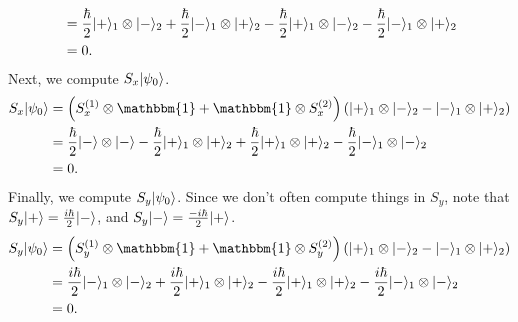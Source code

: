 \documentclass[11pt, letterpaper]{article}
\begin{document}
\begin{enumerate}
\begin{align*}
			&=\frac{\hbar }{2} \lvert+\rangle_1 \otimes \lvert-\rangle_2+\frac{\hbar }{2} \lvert-\rangle_1 \otimes \lvert+\rangle _2-\frac{\hbar }{2} \lvert+\rangle_1 \otimes \lvert-\rangle _2-\frac{\hbar }{2} \lvert-\rangle _1\otimes \lvert+\rangle _2\\
			&=0
		.\end{align*}
		Next, we compute $S_x\lvert\psi _0\rangle $.
		\begin{align*}
			S_x\ket{\psi _0} &=\left( S_x^{(1)} \otimes \mathbbm{1}+\mathbbm{1}\otimes S_x^{(2)}   \right) \left( \ket{+}_1 \otimes \ket{-} _2-\ket{-} _1\otimes \ket{+} _2 \right)\\
			&=\frac{\hbar }{2} \ket{-} \otimes \ket{-} -\frac{\hbar }{2} \ket{+} _1 \otimes \ket{+} _2+\frac{\hbar }{2} \ket{+} _1\otimes \ket{+} _2-\frac{\hbar }{2} \ket{-} _1\otimes \ket{-} _2\\
			&=0
		.\end{align*}
		Finally, we compute $S_y\lvert\psi _0\rangle $. Since we don't often compute things in $S_y$, note that $S_y\lvert+\rangle =\frac{i\hbar }{2} \lvert-\rangle $, and $S_y\lvert-\rangle =\frac{-i\hbar }{2} \lvert+\rangle $.
		\begin{align*}
			S_y\ket{\psi _0} &=\left( S_y^{(1)} \otimes \mathbbm{1}+\mathbbm{1}\otimes S_y^{(2)}   \right) \left( \ket{+}_1 \otimes \ket{-} _2-\ket{-} _1\otimes \ket{+} _2 \right)\\
			&=\frac{i\hbar }{2} \ket{-}_1 \otimes \ket{-}_2 +\frac{i\hbar }{2} \ket{+}_1 \otimes \ket{+}_2-\frac{i\hbar }{2} \ket{+}_1\otimes \ket{+} _2-\frac{i\hbar }{2} \ket{-} _1\otimes \ket{-} _2\\
			&=0
		.\end{align*}
\end{enumerate}
\end{document}
